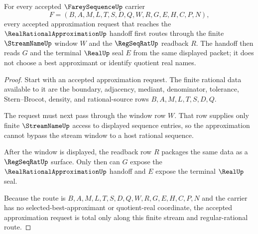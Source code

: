 \begin{theorem}
\label{thm:farey-sequence-stream-approximation-totality}
For every accepted $\FareySequenceUp$ carrier
$$
F=(B,A,M,L,T,S,D,Q,W,R,G,E,H,C,P,N),
$$
every accepted approximation request that reaches the $\RealRationalApproximationUp$ handoff first routes through the finite $\StreamNameUp$ window $W$ and the $\RegSeqRatUp$ readback $R$. The handoff then reads $G$ and the terminal $\RealUp$ seal $E$ from the same displayed packet; it does not choose a best approximant or identify quotient real names.
\end{theorem}
\begin{proof}
Start with an accepted approximation request. The finite rational data available to it are the boundary, adjacency, mediant, denominator, tolerance, Stern--Brocot, density, and rational-source rows $B,A,M,L,T,S,D,Q$.

The request must next pass through the window row $W$. That row supplies only finite $\StreamNameUp$ access to displayed sequence entries, so the approximation cannot bypass the stream window to a host rational sequence.

After the window is displayed, the readback row $R$ packages the same data as a $\RegSeqRatUp$ surface. Only then can $G$ expose the $\RealRationalApproximationUp$ handoff and $E$ expose the terminal $\RealUp$ seal.

Because the route is $B,A,M,L,T,S,D,Q,W,R,G,E,H,C,P,N$ and the carrier has no selected-best-approximant or quotient-real coordinate, the accepted approximation request is total only along this finite stream and regular-rational route.
\end{proof}

